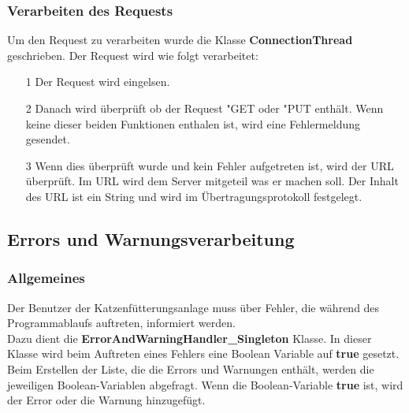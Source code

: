 \subsubsection{Verarbeiten des Requests}
Um den Request zu verarbeiten wurde die Klasse \textbf{ConnectionThread} geschrieben. Der Request wird wie folgt verarbeitet:
\begin{itemize}
\item[1] Der Request wird eingelsen.
\item[2] Danach wird überprüft ob der Request "GET\grqq{} oder "PUT\grqq{} enthält. Wenn keine dieser beiden Funktionen enthalen ist, wird eine Fehlermeldung gesendet.
\item[3] Wenn dies überprüft wurde und kein Fehler aufgetreten ist, wird der URL überprüft. Im URL wird dem Server mitgeteil was er machen soll. Der Inhalt des URL ist ein String und wird im Übertragungsprotokoll festgelegt.
\end{itemize}

\subsection{Errors und Warnungsverarbeitung}
\subsubsection{Allgemeines}
Der Benutzer der Katzenfütterungsanlage muss über Fehler, die während des Programmablaufs auftreten, informiert werden. 
\\ Dazu dient die \textbf{ErrorAndWarningHandler\_Singleton} Klasse. In dieser Klasse wird beim Auftreten eines Fehlers eine Boolean Variable auf \textbf{true} gesetzt. Beim Erstellen der Liste, die die Errors und Warnungen enthält, werden die jeweiligen Boolean-Variablen abgefragt. Wenn die Boolean-Variable \textbf{true} ist, wird der Error oder die Warnung hinzugefügt. 

\newpage

